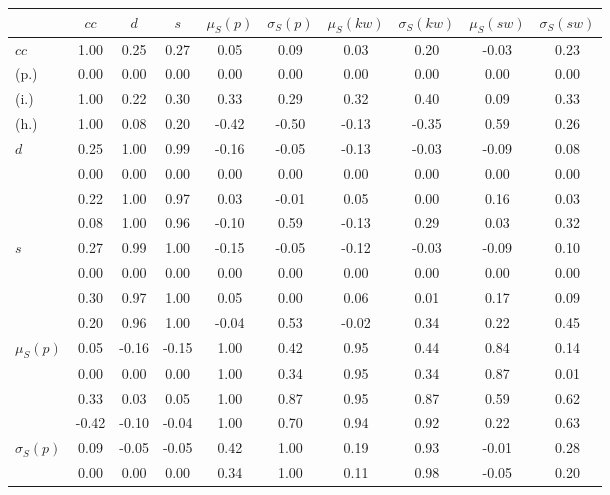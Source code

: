 \begin{table*}[h!]
\begin{center}
\begin{tabular}{| l | c | c | c | c | c | c | c | c | c |}\hline
 & $cc$ & $d$ & $s$ & $\mu_S(p)$ & $\sigma_S(p)$ & $\mu_S(kw)$ & $\sigma_S(kw)$ & $\mu_S(sw)$ & $\sigma_S(sw)$ \\\hline
$cc$ & 1.00  & 0.25  & 0.27  & 0.05  & 0.09  & 0.03  & 0.20  & -0.03  & 0.23 \\\hline
(p.) & 0.00  & 0.00  & 0.00  & 0.00  & 0.00  & 0.00  & 0.00  & 0.00  & 0.00 \\\hline
(i.) & 1.00  & 0.22  & 0.30  & 0.33  & 0.29  & 0.32  & 0.40  & 0.09  & 0.33 \\\hline
(h.) & 1.00  & 0.08  & 0.20  & -0.42  & -0.50  & -0.13  & -0.35  & 0.59  & 0.26 \\\hline
$d$ & 0.25  & 1.00  & 0.99  & -0.16  & -0.05  & -0.13  & -0.03  & -0.09  & 0.08 \\\hline
 & 0.00  & 0.00  & 0.00  & 0.00  & 0.00  & 0.00  & 0.00  & 0.00  & 0.00 \\\hline
 & 0.22  & 1.00  & 0.97  & 0.03  & -0.01  & 0.05  & 0.00  & 0.16  & 0.03 \\\hline
 & 0.08  & 1.00  & 0.96  & -0.10  & 0.59  & -0.13  & 0.29  & 0.03  & 0.32 \\\hline
$s$ & 0.27  & 0.99  & 1.00  & -0.15  & -0.05  & -0.12  & -0.03  & -0.09  & 0.10 \\\hline
 & 0.00  & 0.00  & 0.00  & 0.00  & 0.00  & 0.00  & 0.00  & 0.00  & 0.00 \\\hline
 & 0.30  & 0.97  & 1.00  & 0.05  & 0.00  & 0.06  & 0.01  & 0.17  & 0.09 \\\hline
 & 0.20  & 0.96  & 1.00  & -0.04  & 0.53  & -0.02  & 0.34  & 0.22  & 0.45 \\\hline
$\mu_S(p)$ & 0.05  & -0.16  & -0.15  & 1.00  & 0.42  & 0.95  & 0.44  & 0.84  & 0.14 \\\hline
 & 0.00  & 0.00  & 0.00  & 1.00  & 0.34  & 0.95  & 0.34  & 0.87  & 0.01 \\\hline
 & 0.33  & 0.03  & 0.05  & 1.00  & 0.87  & 0.95  & 0.87  & 0.59  & 0.62 \\\hline
 & -0.42  & -0.10  & -0.04  & 1.00  & 0.70  & 0.94  & 0.92  & 0.22  & 0.63 \\\hline
$\sigma_S(p)$ & 0.09  & -0.05  & -0.05  & 0.42  & 1.00  & 0.19  & 0.93  & -0.01  & 0.28 \\\hline
 & 0.00  & 0.00  & 0.00  & 0.34  & 1.00  & 0.11  & 0.98  & -0.05  & 0.20 \\\hline

\end{tabular}
\end{center}
\end{table*}
